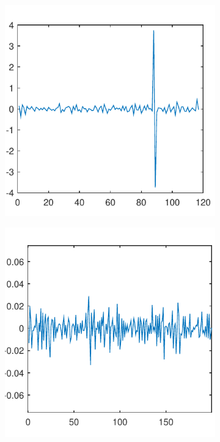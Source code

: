 \documentclass[sigconf]{acmart}
\begin{document}
	\begin{figure}[!htp]
		\centering
		\begin{subfigure}[t]{0.45\linewidth}
			\centering
			\includegraphics[width=0.95\linewidth]{fig/RTT_8}
			\label{fig:3.3a}
		\end{subfigure}
		\begin{subfigure}[t]{0.45\linewidth}
			\centering
			\includegraphics[width=0.95\linewidth]{fig/RTT_20}

\end{subfigure}
\end{figure}
\end{document}
